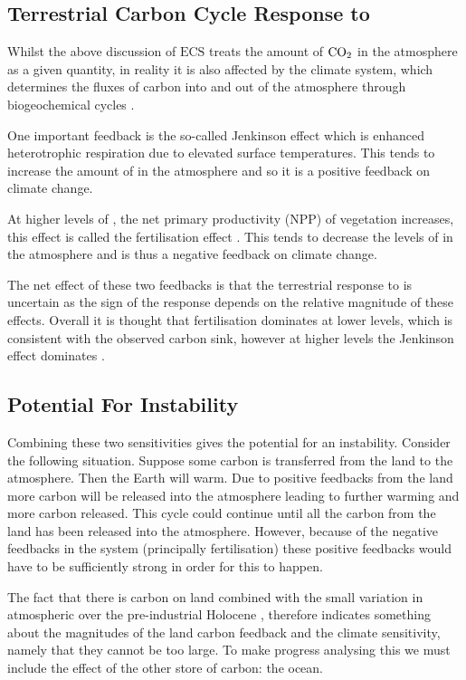 \subsection{Terrestrial Carbon Cycle Response to }
Whilst the above discussion of $\mathrm{ECS}$ treats the amount of $\ce{CO2}$ in the atmosphere as a given quantity, in reality it is also affected by the climate
system, which determines the fluxes of carbon into and out of the atmosphere through biogeochemical cycles \parencite{Rothman2014}.

One important feedback is the so-called Jenkinson effect \parencite{Jenkinson1991} which is enhanced heterotrophic respiration due to elevated surface temperatures. This
tends to increase the amount of  in the atmosphere and so it is a positive feedback on climate change.

At higher levels of , the net primary productivity (NPP) of vegetation increases, this effect is called the  fertilisation effect \parencite{Wenzel2016}.
This tends to decrease the levels of  in the atmosphere and is thus a negative feedback on climate change.

The net effect of these two feedbacks is that the terrestrial response to  is uncertain as the sign of the response depends on the relative magnitude of these effects. Overall it
is thought that  fertilisation dominates at lower  levels, which is consistent with the observed carbon sink, however at higher  levels the Jenkinson effect
dominates \parencite{Cox2000,Friedlingstein2006,Arora2020}.

\subsection{Potential For Instability}
Combining these two sensitivities gives the potential for an instability. Consider the following situation. Suppose some carbon is transferred from the land to the atmosphere. Then the Earth
will warm. Due to positive feedbacks from the land more carbon will be released into the atmosphere leading to further warming and more carbon released. This cycle could continue until all the
carbon from the land has been released into the atmosphere. However, because of the negative feedbacks in the system (principally  fertilisation) these positive feedbacks would have to be
sufficiently strong in order for this to happen.

The fact that there is carbon on land \parencite{Crowther2019} combined with the small variation in atmospheric  over the pre-industrial Holocene \parencite{Marcott2014,Bauska2015},
therefore indicates something about the magnitudes of the land carbon feedback and the climate sensitivity, namely that they cannot be too large.
To make progress analysing this we must include the effect of the other store of carbon: the ocean.

